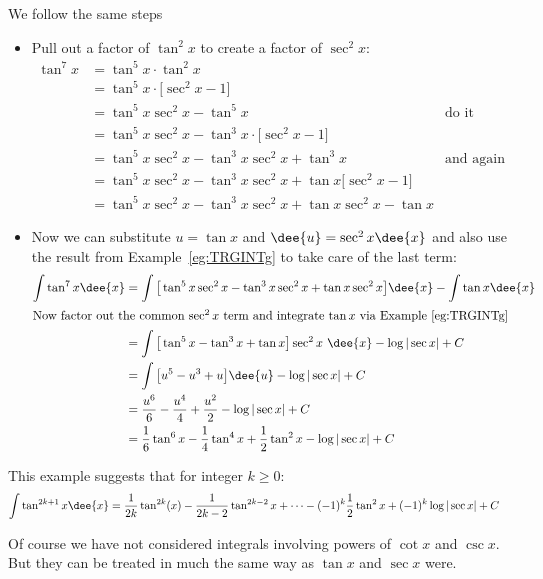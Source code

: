 \begin{eg}
\soln We follow the same steps
\begin{itemize}
 \item Pull out a factor of $\tan^2x$ to create a factor of $\sec^2x$:
\begin{align*}
\tan^7x &= \tan^5x \cdot \tan^2x \\
  &= \tan^5x \cdot \big[ \sec^2x - 1\big]\\
  &= \tan^5x \sec^2x - \tan^5x & \text{do it again}\\
  &= \tan^5x \sec^2x - \tan^3x \cdot \big[ \sec^2x - 1\big]\\
  &= \tan^5x \sec^2x - \tan^3x \sec^2x + \tan^3x &\text{and again}\\
  &= \tan^5x \sec^2x - \tan^3x \sec^2x + \tan x \big[ \sec^2x - 1\big]\\
  &= \tan^5x \sec^2x - \tan^3x \sec^2x + \tan x \sec^2x - \tan x
\end{align*}
\item Now we can substitute $u=\tan x$ and $\dee{u}=\sec^2x \dee{x}$ and also use the
result from Example~\ref{eg:TRGINTg} to take care of the last term:
\begin{align*}
  \int \tan^7x\dee{x}
&= \int \big[\tan^5x \sec^2x - \tan^3x \sec^2x + \tan x \sec^2x\big] \dee{x} - \int \tan
x \dee{x} \\
\intertext{Now factor out the common $\sec^2x$ term and integrate $\tan x$ via
Example~\ref{eg:TRGINTg}}
&= \int \big[ \tan^5x - \tan^3x +\tan x\big]\sec^2 x\ \dee{x} - \log|\sec x| +C \\
&= \int \big[ u^5 - u^3 + u \big]\dee{u} - \log|\sec x| +C \\
&= \frac{u^6}{6} - \frac{u^4}{4} + \frac{u^2}{2} - \log|\sec x| +C \\
&= \frac{1}{6}\tan^6x - \frac{1}{4}\tan^4x +\frac{1}{2}\tan^2x - \log|\sec x| +
C
\end{align*}
\end{itemize}
This example suggests that for integer $k\geq 0$:
\begin{align*}
  \int \tan^{2k+1}x \dee{x}
&= \frac{1}{2k}\tan^{2k}(x) - \frac{1}{2k-2}\tan^{2k-2}x +
\cdots - (-1)^k \frac{1}{2} \tan^2 x + (-1)^k \log|\sec x| +C
\end{align*}

\end{eg}

Of course we have not considered integrals involving powers of $\cot x$ and $\csc x$.
But they can be treated in much the same way as $\tan x$ and $\sec x$ were.

